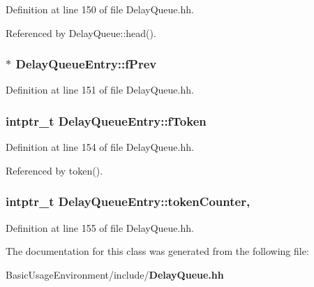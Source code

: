 Definition at line 150 of file Delay\+Queue.\+hh.



Referenced by Delay\+Queue\+::head().

\subsubsection[{f\+Prev}]{$\ast$ Delay\+Queue\+Entry\+::f\+Prev\hspace{0.3cm}{\ttfamily [private]}}\label{classDelayQueueEntry_a9bafd3137d60cd3b5cef4298a01644fd}


Definition at line 151 of file Delay\+Queue.\+hh.

\subsubsection[{f\+Token}]{\setlength{\rightskip}{0pt plus 5cm}intptr\+\_\+t Delay\+Queue\+Entry\+::f\+Token\hspace{0.3cm}{\ttfamily [private]}}\label{classDelayQueueEntry_a4e4a6774b367174401a42bdc8602d888}


Definition at line 154 of file Delay\+Queue.\+hh.



Referenced by token().

\subsubsection[{token\+Counter}]{\setlength{\rightskip}{0pt plus 5cm}intptr\+\_\+t Delay\+Queue\+Entry\+::token\+Counter\hspace{0.3cm}{\ttfamily [static]}, {\ttfamily [private]}}\label{classDelayQueueEntry_af197da566777feabb5768312904696ae}


Definition at line 155 of file Delay\+Queue.\+hh.



The documentation for this class was generated from the following file\+:\begin{DoxyCompactItemize}
\item 
Basic\+Usage\+Environment/include/{\bf Delay\+Queue.\+hh}\end{DoxyCompactItemize}
